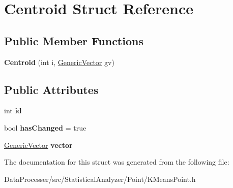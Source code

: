 \hypertarget{structCentroid}{}\section{Centroid Struct Reference}
\label{structCentroid}
\subsection*{Public Member Functions}
\begin{DoxyCompactItemize}
\item 
\mbox{\label{structCentroid_a62991a426ab204818dc692223af4aba0}} 
{\bfseries Centroid} (int i, \hyperlink{classGenericVector}{Generic\+Vector} gv)
\end{DoxyCompactItemize}
\subsection*{Public Attributes}
\begin{DoxyCompactItemize}
\item 
\mbox{\label{structCentroid_a8856877441529189b74f69e3064e51e2}} 
int {\bfseries id}
\item 
\mbox{\label{structCentroid_a3158c9ab870ec09dc2361231184d16f1}} 
bool {\bfseries has\+Changed} = true
\item 
\mbox{\label{structCentroid_a98847724eb23cac48cecd329f3b66c7e}} 
\hyperlink{classGenericVector}{Generic\+Vector} {\bfseries vector}
\end{DoxyCompactItemize}


The documentation for this struct was generated from the following file\+:\begin{DoxyCompactItemize}
\item 
Data\+Processer/src/\+Statistical\+Analyzer/\+Point/K\+Means\+Point.\+h\end{DoxyCompactItemize}
